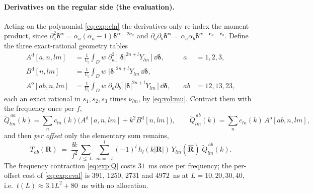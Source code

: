 \paragraph{Derivatives on the regular side (the evaluation).} Acting on the polynomial
\eqref{eq:exp:cln} the derivatives only re-index the moment product, since
$\partial_a^2 \boldsymbol{\delta}^{\boldsymbol{\alpha}} = \alpha_a(\alpha_a-1)
\boldsymbol{\delta}^{\boldsymbol{\alpha}-2\mathbf{e}_a}$ and
$\partial_a\partial_b\boldsymbol{\delta}^{\boldsymbol{\alpha}} = \alpha_a\alpha_b
\boldsymbol{\delta}^{\boldsymbol{\alpha}-\mathbf{e}_a-\mathbf{e}_b}$. Define the three
exact-rational geometry tables
\begin{equation}
\begin{aligned}
A^{\mathrm{d}}[a,n,lm] &= \frac{1}{V_{\mathrm{t}}}\int_D w\;
  \partial_a^2\bigl[\,|\boldsymbol{\delta}|^{2n+l}Y_{lm}\,\bigr]\,\dd\boldsymbol{\delta},
&\quad a &= 1,2,3,\\
B^{\mathrm{d}}[n,lm] &= \frac{1}{V_{\mathrm{t}}}\int_D w\;
  |\boldsymbol{\delta}|^{2n+l}Y_{lm}\,\dd\boldsymbol{\delta},\\
A^{\mathrm{o}}[ab,n,lm] &= \frac{1}{V_{\mathrm{t}}}\int_D w\;
  \partial_a\partial_b\bigl[\,|\boldsymbol{\delta}|^{2n+l}Y_{lm}\,\bigr]\,
  \dd\boldsymbol{\delta}, &\quad ab &= 12, 13, 23,
\end{aligned}
\label{eq:exp:tabs}
\end{equation}
each an exact rational in $s_1,s_2,s_3$ times $\nu_{lm}$, by \eqref{eq:vol:mu}. Contract
them with the frequency once per $f$,
\begin{equation}
\widetilde{Q}^{\,aa}_{lm}(k) = \sum_{n} c_{ln}(k)\bigl(A^{\mathrm{d}}[a,n,lm]
  + k^2 B^{\mathrm{d}}[n,lm]\bigr),
\qquad
\widetilde{Q}^{\,ab}_{lm}(k) = \sum_{n} c_{ln}(k)\,A^{\mathrm{o}}[ab,n,lm],
\label{eq:exp:Q}
\end{equation}
and then \emph{per offset} only the elementary sum remains,
\begin{equation}
\boxed{\;
T_{ab}(\mathbf{R}) \;=\; \frac{\ii k}{f^2}
\sum_{l\,\le\,L}\ \sum_{m=-l}^{l} (-1)^l\,
h_l(k|\mathbf{R}|)\,Y_{lm}(\hat{\mathbf{R}})\;\widetilde{Q}^{\,ab}_{lm}(k).\;}
\label{eq:exp:eval}
\end{equation}
The frequency contraction \eqref{eq:exp:Q} costs $31$~ms once per frequency; the per-offset
cost of \eqref{eq:exp:eval} is $391$, $1250$, $2731$ and $4972$~ns at $L = 10, 20, 30,
40$, i.e.\ $t(L) \approx 3.1L^2 + 80$~ns with no allocation.

